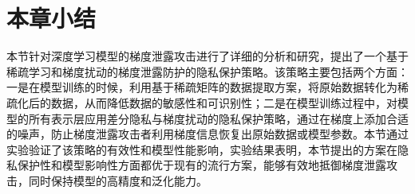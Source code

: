 \section{本章小结}

本节针对深度学习模型的梯度泄露攻击进行了详细的分析和研究，提出了一个基于稀疏学习和梯度扰动的梯度泄露防护的隐私保护策略。该策略主要包括两个方面：一是在模型训练的时候，利用基于稀疏矩阵的数据提取方案，将原始数据转化为稀疏化后的数据，从而降低数据的敏感性和可识别性；二是在模型训练过程中，对模型的所有表示层应用差分隐私与梯度扰动的隐私保护策略，通过在梯度上添加合适的噪声，防止梯度泄露攻击者利用梯度信息恢复出原始数据或模型参数。本节通过实验验证了该策略的有效性和模型性能影响，实验结果表明，本节提出的方案在隐私保护性和模型影响性方面都优于现有的流行方案，能够有效地抵御梯度泄露攻击，同时保持模型的高精度和泛化能力。
